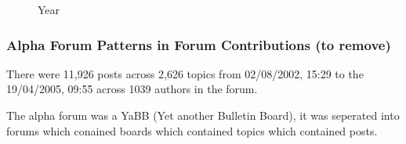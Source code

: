 \documentclass[draft]{article}
\begin{document}
\begin{figure}[h!] 
  \centering 
  
  \caption{Year}
  \label{figure:year}  
\end{figure}


%

%

%

%


\newpage
\subsubsection{Alpha Forum Patterns in Forum Contributions (to remove)}
There were 11,926 posts across 2,626 topics from 02/08/2002, 15:29 to the 19/04/2005, 09:55 across 1039 authors in the forum.

The alpha forum was a YaBB (Yet another Bulletin Board), it was seperated into forums which conained boards which contained topics which contained posts.




\end{document}
